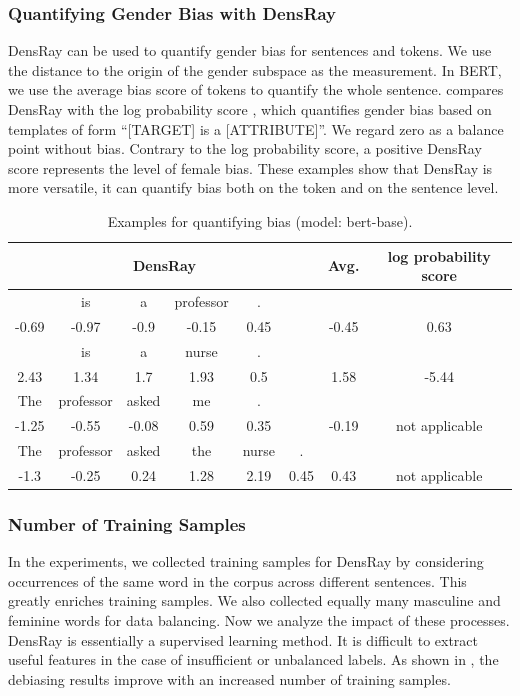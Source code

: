 \subsubsection*{Quantifying Gender Bias with DensRay}
DensRay can be used to quantify gender bias for sentences
and tokens. We use the distance to the origin of the gender
subspace as the measurement. In BERT, we use the average
bias score of tokens to quantify the whole
sentence.  compares DensRay with the log
probability score \cite{kurita2019measuring}, which
quantifies gender bias based on templates of form ``[TARGET]
is a [ATTRIBUTE]''. We regard zero as a balance point
without bias. Contrary to the log probability score, a
positive DensRay score represents the level of female
bias. These examples show that DensRay is more versatile, it
can quantify  bias both on the token and on the sentence level.
\begin{table}[h]
	\centering
	\scriptsize
	\begin{tabular}{cccccc|c||c}
		\hline
		\multicolumn{6}{c|}{DensRay}&Avg.&log probability score\\		
		\hline\hline
		[MASK] &is &a &professor& . &&&\\
		-0.69 &-0.97 &-0.9  &-0.15  &0.45& &-0.45& 0.63\\
		\hline
		[MASK] &is &a &nurse& . &&&\\
		2.43  &1.34  &1.7   &1.93  &0.5&& 1.58 &-5.44\\
		\hline
		The &professor &asked &me& . &&&\\
		-1.25 &-0.55 &-0.08  &0.59  &0.35 &&-0.19 &
                not applicable\\
		\hline
		The &professor &asked &the&nurse &.&&\\
		-1.3&  -0.25  &0.24  &1.28  &2.19
                &0.45&0.43& not applicable\\
		\hline
	\end{tabular}
	\caption{
		Examples for quantifying bias (model: bert-base).}
\end{table}



\subsubsection*{Number of Training Samples}
In the experiments, we collected training samples for DensRay by considering occurrences of the same word in the corpus across different sentences. This greatly enriches training samples. We also collected equally many masculine and feminine words for data balancing. Now we analyze the impact of these processes. DensRay is essentially a supervised learning method. It is difficult to extract useful features in the case of insufficient or unbalanced labels.  As shown in , the debiasing results improve with an increased number of training samples.

